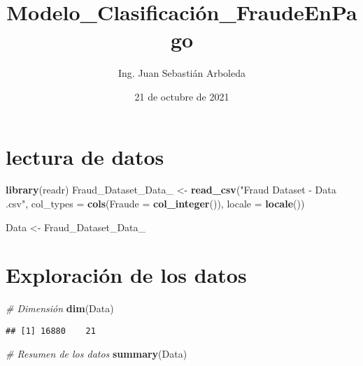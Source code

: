 \documentclass[]{article}
\title{Modelo\_Clasificación\_FraudeEnPago}
\author{Ing. Juan Sebastián Arboleda}
\date{21 de octubre de 2021}
\newenvironment{Shaded}{\begin{snugshade}}{\end{snugshade}}
\newcommand{\CommentTok}[1]{\textcolor[rgb]{0.56,0.35,0.01}{\textit{#1}}}
\newcommand{\DataTypeTok}[1]{\textcolor[rgb]{0.13,0.29,0.53}{#1}}
\newcommand{\KeywordTok}[1]{\textcolor[rgb]{0.13,0.29,0.53}{\textbf{#1}}}
\newcommand{\NormalTok}[1]{#1}
\newcommand{\StringTok}[1]{\textcolor[rgb]{0.31,0.60,0.02}{#1}}
\begin{document}
\maketitle

\hypertarget{lectura-de-datos}{%
\section{lectura de datos}\label{lectura-de-datos}}

\begin{Shaded}
\begin{Highlighting}[]
\KeywordTok{library}\NormalTok{(readr)}
\NormalTok{Fraud_Dataset_Data_ <-}\StringTok{ }\KeywordTok{read_csv}\NormalTok{(}\StringTok{"Fraud Dataset  - Data .csv"}\NormalTok{, }
    \DataTypeTok{col_types =} \KeywordTok{cols}\NormalTok{(}\DataTypeTok{Fraude =} \KeywordTok{col_integer}\NormalTok{()), }
    \DataTypeTok{locale =} \KeywordTok{locale}\NormalTok{())}

\NormalTok{Data <-}\StringTok{ }\NormalTok{Fraud_Dataset_Data_}
\end{Highlighting}
\end{Shaded}

\hypertarget{exploraciuxf3n-de-los-datos}{%
\section{Exploración de los datos}\label{exploraciuxf3n-de-los-datos}}

\begin{Shaded}
\begin{Highlighting}[]
\CommentTok{# Dimensión}
\KeywordTok{dim}\NormalTok{(Data)}
\end{Highlighting}
\end{Shaded}

\begin{verbatim}
## [1] 16880    21
\end{verbatim}

\begin{Shaded}
\begin{Highlighting}[]
\CommentTok{# Resumen de los datos}
\KeywordTok{summary}\NormalTok{(Data)}
\end{Highlighting}
\end{Shaded}
\end{document}

